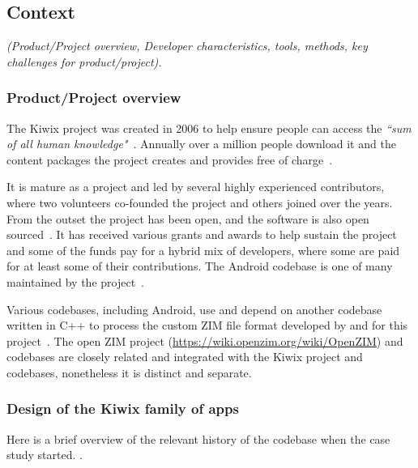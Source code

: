 
\subsection{Context}
\textit{(Product/Project overview, Developer characteristics, tools, methods, key challenges for product/project).}

\subsubsection{Product/Project overview}
The Kiwix project was created in 2006 to help ensure people can access the \emph{``sum of all human knowledge"}~\citep{coillet2016-wikimedia-kiwix-ten-years}. Annually over a million people download it and the content packages the project creates and provides free of charge~\citep{coillet2016-wikimedia-kiwix-ten-years}.

It is mature as a project and led by several highly experienced contributors, where two volunteers co-founded the project and others joined over the years. From the outset the project has been open, and the software is also open sourced~\citep{sutherland2014_wikimedia_on_kelson}. It has received various grants and awards to help sustain the project and some of the funds pay for a hybrid mix of developers, where some are paid for at least some of their contributions. The Android codebase is one of many maintained by the project~\citep{gaudin2017_wikimedia_kiwix_android}. 

Various codebases, including Android, use and depend on another codebase written in C++ to process the custom ZIM file format developed by and for this project~\citep{gaudin2017_wikimedia_kiwix_android}. The open ZIM project (\url{https://wiki.openzim.org/wiki/OpenZIM}) and codebases are closely related and integrated with the Kiwix project and codebases, nonetheless it is distinct and separate.

\subsubsection{Design of the Kiwix family of apps}
Here is a brief overview of the relevant history of the codebase when the case study started. .

